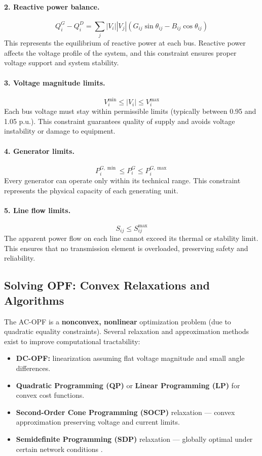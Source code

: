 \documentclass[11pt]{article}
\begin{document}
	\paragraph{2. Reactive power balance.}
	\[
	Q_i^{G} - Q_i^{D} = \sum_{j} |V_i||V_j|(G_{ij}\sin\theta_{ij} - B_{ij}\cos\theta_{ij})
	\]
	This represents the equilibrium of reactive power at each bus. Reactive power affects the voltage profile of the system, and this constraint ensures proper voltage support and system stability.
	
	\paragraph{3. Voltage magnitude limits.}
	\[
	V_i^{\min} \le |V_i| \le V_i^{\max}
	\]
	Each bus voltage must stay within permissible limits (typically between 0.95 and 1.05 p.u.). This constraint guarantees quality of supply and avoids voltage instability or damage to equipment.
	
	\paragraph{4. Generator limits.}
	\[
	P_i^{G,\min} \le P_i^{G} \le P_i^{G,\max}
	\]
	Every generator can operate only within its technical range. This constraint represents the physical capacity of each generating unit.
	
	\paragraph{5. Line flow limits.}
	\[
	S_{ij} \le S_{ij}^{\max}
	\]
	The apparent power flow on each line cannot exceed its thermal or stability limit. This ensures that no transmission element is overloaded, preserving safety and reliability.
	
	\subsection{Solving OPF: Convex Relaxations and Algorithms}
	
	The AC-OPF is a \textbf{nonconvex, nonlinear} optimization problem (due to quadratic equality constraints).  
	Several relaxation and approximation methods exist to improve computational tractability:
	
	\begin{itemize}
		\item \textbf{DC-OPF:} linearization assuming flat voltage magnitude and small angle differences.
		\item \textbf{Quadratic Programming (QP)} or \textbf{Linear Programming (LP)} for convex cost functions.
		\item \textbf{Second-Order Cone Programming (SOCP)} relaxation — convex approximation preserving voltage and current limits.
		\item \textbf{Semidefinite Programming (SDP)} relaxation — globally optimal under certain network conditions \cite{lavaei2012zero}.
	\end{itemize}
	
\end{document}
